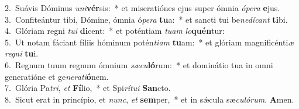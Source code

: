 {2.~}Suávis Dóminus \textit{u}\textit{ni}\textbf{vér}sis:~* et miseratiónes ejus super ómnia \textit{ó}\textit{pe}\textit{ra} \textbf{e}jus.\\
{3.~}Confiteántur tibi, Dómine, ómnia ó\textit{pe}\textit{ra} \textbf{tu}a:~* et sancti tui be\textit{ne}\textit{dí}\textit{cant} \textbf{ti}bi.\\
{4.~}Glóriam regni \textit{tu}\textit{i} \textbf{di}cent:~* et poténtiam \textit{tu}\textit{am} \textit{lo}\textbf{quén}tur:\\
{5.~}Ut notam fáciant fíliis hóminum potén\textit{ti}\textit{am} \textbf{tu}am:~* et glóriam magnificénti\textit{æ} \textit{re}\textit{gni} \textbf{tu}i.\\
{6.~}Regnum tuum regnum ómnium \textit{sæ}\textit{cu}\textbf{ló}rum:~* et dominátio tua in omni generatióne et ge\textit{ne}\textit{ra}\textit{ti}\textbf{ó}nem.\\
{7.~}Glória Pa\textit{tri}, \textit{et} \textbf{Fí}lio,~* et Spi\textit{rí}\textit{tu}\textit{i} \textbf{San}cto.\\
{8.~}Sicut erat in princípio, et \textit{nunc}, \textit{et} \textbf{sem}per,~* et in sǽcula sæ\textit{cu}\textit{ló}\textit{rum}. \textbf{A}men.\\
